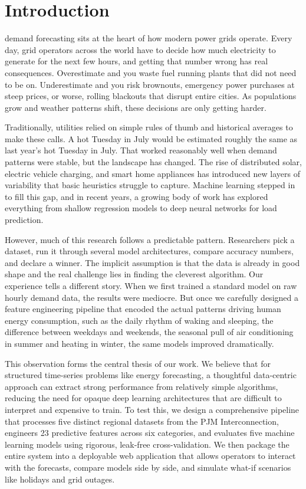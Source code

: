 \documentclass[conference]{IEEEtran}
\begin{document}
\section{Introduction}
 demand forecasting sits at the heart of how modern power grids operate. Every day, grid operators across the world have to decide how much electricity to generate for the next few hours, and getting that number wrong has real consequences. Overestimate and you waste fuel running plants that did not need to be on. Underestimate and you risk brownouts, emergency power purchases at steep prices, or worse, rolling blackouts that disrupt entire cities. As populations grow and weather patterns shift, these decisions are only getting harder. \par

Traditionally, utilities relied on simple rules of thumb and historical averages to make these calls. A hot Tuesday in July would be estimated roughly the same as last year's hot Tuesday in July. That worked reasonably well when demand patterns were stable, but the landscape has changed. The rise of distributed solar, electric vehicle charging, and smart home appliances has introduced new layers of variability that basic heuristics struggle to capture. Machine learning stepped in to fill this gap, and in recent years, a growing body of work has explored everything from shallow regression models to deep neural networks for load prediction. \par

However, much of this research follows a predictable pattern. Researchers pick a dataset, run it through several model architectures, compare accuracy numbers, and declare a winner. The implicit assumption is that the data is already in good shape and the real challenge lies in finding the cleverest algorithm. Our experience tells a different story. When we first trained a standard model on raw hourly demand data, the results were mediocre. But once we carefully designed a feature engineering pipeline that encoded the actual patterns driving human energy consumption, such as the daily rhythm of waking and sleeping, the difference between weekdays and weekends, the seasonal pull of air conditioning in summer and heating in winter, the same models improved dramatically. \par

This observation forms the central thesis of our work. We believe that for structured time-series problems like energy forecasting, a thoughtful data-centric approach can extract strong performance from relatively simple algorithms, reducing the need for opaque deep learning architectures that are difficult to interpret and expensive to train. To test this, we design a comprehensive pipeline that processes five distinct regional datasets from the PJM Interconnection, engineers 23 predictive features across six categories, and evaluates five machine learning models using rigorous, leak-free cross-validation. We then package the entire system into a deployable web application that allows operators to interact with the forecasts, compare models side by side, and simulate what-if scenarios like holidays and grid outages. \par
\end{document}
